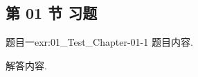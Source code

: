 \subsection{第 01 节 习题}


\begin{exercise}{题目一}{exr:01_Test_Chapter-01-1}
    题目内容.
\end{exercise}

\begin{solution}
    解答内容.
\end{solution}
